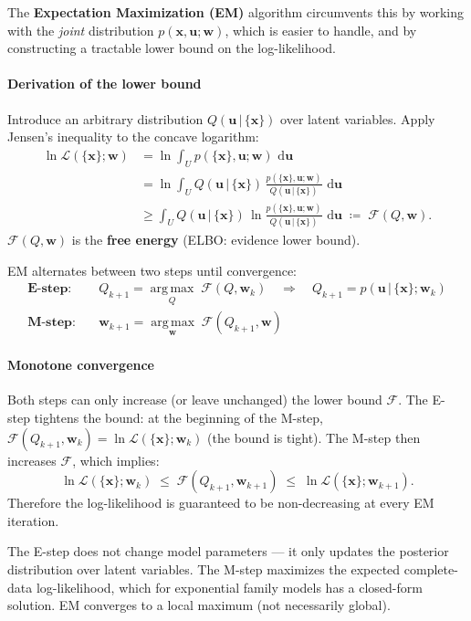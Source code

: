\documentclass[11pt, oneside]{book}
\newcommand{\argmax}{\operatorname*{arg\,max}}
\newcommand{\dd}{\,\mathrm{d}}
\newcommand{\wvec}{\bm{w}}
\newcommand{\xvec}{\bm{x}}
\newcommand{\uvec}{\bm{u}}
\newcommand{\lhood}{\mathcal{L}}
\newcommand{\Fbound}{\mathcal{F}}
\newcommand{\given}{\,\vert\,}
\newcommand{\eqdef}{\coloneqq}
\begin{document}
The \textbf{Expectation Maximization (EM)} algorithm circumvents this by working with
the \emph{joint} distribution $p(\xvec, \uvec;\wvec)$, which is easier to handle, and
by constructing a tractable lower bound on the log-likelihood.

\paragraph{Derivation of the lower bound}
Introduce an arbitrary distribution $Q(\uvec \given \{\xvec\})$ over latent variables.
Apply Jensen's inequality to the concave logarithm:
\begin{align*}
  \ln \lhood(\{\xvec\};\wvec)
  &= \ln \int_U p(\{\xvec\},\uvec;\wvec)\,\dd\uvec \\
  &= \ln \int_U Q(\uvec \given \{\xvec\})\,
     \frac{p(\{\xvec\},\uvec;\wvec)}{Q(\uvec \given \{\xvec\})}\,\dd\uvec \\
  &\geq \int_U Q(\uvec \given \{\xvec\})\,
     \ln\frac{p(\{\xvec\},\uvec;\wvec)}{Q(\uvec \given \{\xvec\})}\,\dd\uvec
  \;\eqdef\; \Fbound(Q,\wvec).
\end{align*}
$\Fbound(Q,\wvec)$ is the \textbf{free energy} (ELBO: evidence lower bound).

\begin{thmbox}[title={EM Algorithm}]
EM alternates between two steps until convergence:
\begin{align*}
  \textbf{E-step:} \quad & Q_{k+1} = \argmax_{Q}\; \Fbound(Q,\wvec_k)
    \quad \Rightarrow \quad Q_{k+1} = p(\uvec \given \{\xvec\};\wvec_k) \\[4pt]
  \textbf{M-step:} \quad & \wvec_{k+1} = \argmax_{\wvec}\; \Fbound(Q_{k+1},\wvec)
\end{align*}
\end{thmbox}

\paragraph{Monotone convergence}
Both steps can only increase (or leave unchanged) the lower bound $\Fbound$.
The E-step tightens the bound: at the beginning of the M-step,
$\Fbound(Q_{k+1},\wvec_k) = \ln\lhood(\{\xvec\};\wvec_k)$ (the bound is tight).
The M-step then increases $\Fbound$, which implies:
\[
  \ln\lhood(\{\xvec\};\wvec_k) \;\leq\; \Fbound(Q_{k+1},\wvec_{k+1}) \;\leq\; \ln\lhood(\{\xvec\};\wvec_{k+1}).
\]
Therefore the log-likelihood is guaranteed to be non-decreasing at every EM iteration.

\begin{intbox}
  The E-step does not change model parameters --- it only updates the posterior
  distribution over latent variables. The M-step maximizes the expected complete-data
  log-likelihood, which for exponential family models has a closed-form solution.
  EM converges to a local maximum (not necessarily global).
\end{intbox}
\end{document}
